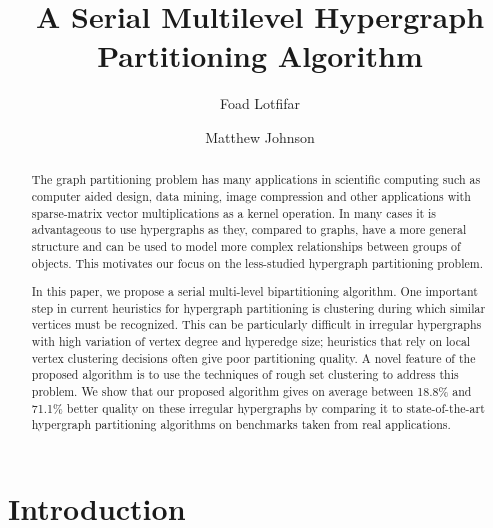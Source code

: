 \documentclass[twocolumn]{svjour3}          \smartqed
\date{}
\begin{document}
\title{A Serial Multilevel Hypergraph Partitioning Algorithm}


\author{Foad Lotfifar         \and
        Matthew Johnson 
}




\maketitle

\begin{abstract}

The graph partitioning problem has many applications in scientific computing such as computer aided design, data mining, image compression and other applications with sparse-matrix vector multiplications as a kernel operation.  In many cases it is advantageous to use hypergraphs as they, compared to graphs, have a more general structure and can be used to model more complex relationships between groups of objects.   This motivates our focus on the  less-studied hypergraph partitioning problem.

In this paper, we propose a serial multi-level bipartitioning algorithm.  One important step in current heuristics for hypergraph partitioning is clustering during which similar vertices must be recognized.  This can be particularly difficult in irregular hypergraphs with high variation of vertex degree and hyperedge size;  heuristics that rely on local vertex clustering decisions often give poor partitioning quality.  A novel feature of the proposed algorithm is to use the techniques of rough set clustering to address this problem.  We show that our proposed algorithm gives on average between 18.8\% and 71.1\% better quality on these irregular hypergraphs by comparing it to state-of-the-art hypergraph partitioning algorithms on benchmarks taken from real applications.

\end{abstract}

\section{Introduction}\label{sec:intro}
\end{document}
